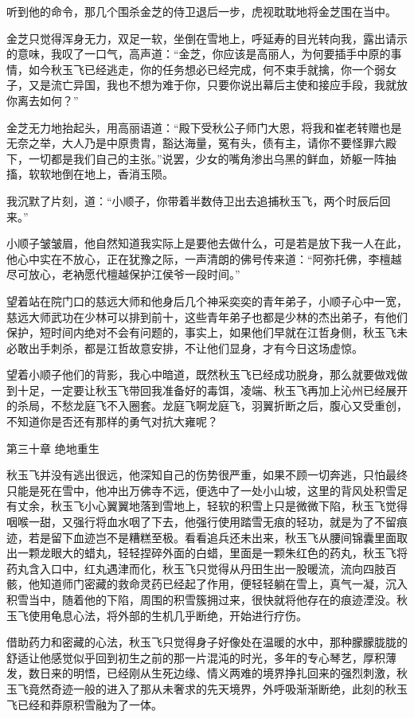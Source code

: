 听到他的命令，那几个围杀金芝的侍卫退后一步，虎视耽耽地将金芝围在当中。

金芝只觉得浑身无力，双足一软，坐倒在雪地上，呼延寿的目光转向我，露出请示的意味，我叹了一口气，高声道：“金芝，你应该是高丽人，为何要插手中原的事情，如今秋玉飞已经逃走，你的任务想必已经完成，何不束手就擒，你一个弱女子，又是流亡异国，我也不想为难于你，只要你说出幕后主使和接应手段，我就放你离去如何？”

金芝无力地抬起头，用高丽语道：“殿下受秋公子师门大恩，将我和崔老转赠也是无奈之举，大人乃是中原贵胄，豁达海量，冤有头，债有主，请你不要怪罪六殿下，一切都是我们自己的主张。”说罢，少女的嘴角渗出乌黑的鲜血，娇躯一阵抽搐，软软地倒在地上，香消玉陨。

我沉默了片刻，道：“小顺子，你带着半数侍卫出去追捕秋玉飞，两个时辰后回来。”

小顺子皱皱眉，他自然知道我实际上是要他去做什么，可是若是放下我一人在此，他心中实在不放心，正在犹豫之际，一声清朗的佛号传来道：“阿弥托佛，李檀越尽可放心，老衲愿代檀越保护江侯爷一段时间。”

望着站在院门口的慈远大师和他身后几个神采奕奕的青年弟子，小顺子心中一宽，慈远大师武功在少林可以排到前十，这些青年弟子也都是少林的杰出弟子，有他们保护，短时间内绝对不会有问题的，事实上，如果他们早就在江哲身侧，秋玉飞未必敢出手刺杀，都是江哲故意安排，不让他们显身，才有今日这场虚惊。

望着小顺子他们的背影，我心中暗道，既然秋玉飞已经成功脱身，那么就要做戏做到十足，一定要让秋玉飞带回我准备好的毒饵，凌端、秋玉飞再加上沁州已经展开的杀局，不愁龙庭飞不入圈套。龙庭飞啊龙庭飞，羽翼折断之后，腹心又受重创，不知道你是否还有那样的勇气对抗大雍呢？

第三十章    绝地重生

秋玉飞并没有逃出很远，他深知自己的伤势很严重，如果不顾一切奔逃，只怕最终只能是死在雪中，他冲出万佛寺不远，便选中了一处小山坡，这里的背风处积雪足有丈余，秋玉飞小心翼翼地落到雪地上，轻软的积雪上只是微微下陷，秋玉飞觉得咽喉一甜，又强行将血水咽了下去，他强行使用踏雪无痕的轻功，就是为了不留痕迹，若是留下血迹岂不是糟糕至极。看看追兵还未出来，秋玉飞从腰间锦囊里面取出一颗龙眼大的蜡丸，轻轻捏碎外面的白蜡，里面是一颗朱红色的药丸，秋玉飞将药丸含入口中，红丸遇津而化，秋玉飞只觉得从丹田生出一股暖流，流向四肢百骸，他知道师门密藏的救命灵药已经起了作用，便轻轻躺在雪上，真气一凝，沉入积雪当中，随着他的下陷，周围的积雪簇拥过来，很快就将他存在的痕迹湮没。秋玉飞使用龟息心法，将外部的生机几乎断绝，开始进行疗伤。

借助药力和密藏的心法，秋玉飞只觉得身子好像处在温暖的水中，那种朦朦胧胧的舒适让他感觉似乎回到初生之前的那一片混沌的时光，多年的专心琴艺，厚积薄发，数日来的明悟，已经刚从生死边缘、情义两难的境界挣扎回来的强烈刺激，秋玉飞竟然奇迹一般的进入了那从未奢求的先天境界，外呼吸渐渐断绝，此刻的秋玉飞已经和莽原积雪融为了一体。

